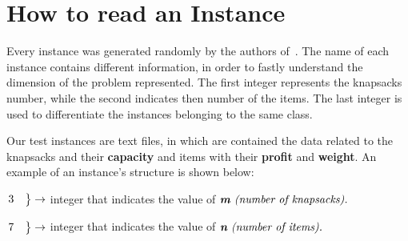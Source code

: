 \section{How to read an Instance}
Every instance was generated randomly by the authors of~\cite{mkp:2019}.
The name of each instance contains different information, in order to fastly understand the dimension of the problem represented.
The first integer represents the knapsacks number, while the second indicates then number of the items.
The last integer is used to differentiate the instances belonging to the same class.


Our test instances are text files, in which are contained the data related to the knapsacks and their \textbf{capacity} and items with their \textbf{profit} and \textbf{weight}. An example of an instance's structure is shown below:

\begin{flushleft}
    $\begin{rcases*}
         3 \quad
    \end{rcases*} \rightarrow $ integer that indicates the value of $ \textit{\textbf{m} (number of knapsacks).}$
\end{flushleft}
\begin{flushleft}
    $\begin{rcases*}
         7 \quad
    \end{rcases*} \rightarrow $ integer that indicates the value of $ \textit{\textbf{n} (number of items).}$
\end{flushleft}

